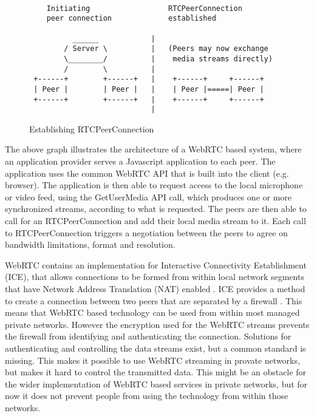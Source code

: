 \documentclass[english,12pt,a4paper,dvips]{article}
\begin{document}
\begin{figure}
\begin{verbatim}

    Initiating                  RTCPeerConnection
    peer connection             established
    
          ______            |
        / Server \          |   (Peers may now exchange 
        \________/          |    media streams directly)
        /        \          |
 +------+        +------+   |    +------+     +------+
 | Peer |        | Peer |   |    | Peer |=====| Peer |
 +------+        +------+   |    +------+     +------+
                            |
\end{verbatim}
\caption{Establishing RTCPeerConnection}
\label{fig:peer-connection}
\end{figure}

The above graph illustrates the architecture of a WebRTC based system, where an application provider serves a Javascript application to each peer. The application uses the common WebRTC API that is built into the client (e.g. browser). The application is then able to request access to the local microphone or video feed, using the GetUserMedia API call, which produces one or more synchronized streams, according to what is requested. The peers are then able to call for an RTCPeerConnection and add their local media stream to it. Each call to RTCPeerConnection triggers a negotiation between the peers to agree on bandwidth limitations, format and resolution. \cite{Jennings} \cite{Garaizar}

WebRTC contains an implementation for Interactive Connectivity Establishment (ICE), that allows connections to be formed from within local network segments that have Network Address Translation (NAT) enabled \cite{Jennings} \cite{Johnston}. ICE provides a method to create a connection between two peers that are separated by a firewall \cite{Rosenberg}. This means that WebRTC based technology can be used from within most managed private networks. However the encryption used for the WebRTC streams prevents the firewall from identifying and authenticating the connection. Solutions for authenticating and controlling the data streams exist, but a common standard is missing. This makes it possible to use WebRTC streaming in provate networks, but makes it hard to control the transmitted data. \cite{Johnston} This might be an obstacle for the wider implementation of WebRTC based services in private networks, but for now it does not prevent people from using the technology from within those networks.
\end{document}
